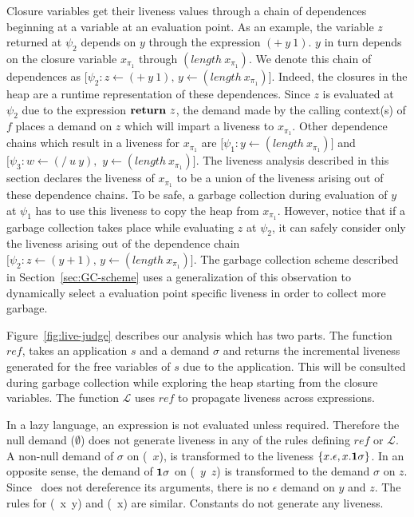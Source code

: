 \documentclass[preprint,9pt]{sigplanconf}
\begin{document}
  Closure  variables get  their  liveness values  through  a chain  of
  dependences beginning at  a variable at an evaluation  point.  As an
  example,  the  variable $z$  returned  at  $\psi_2$ depends  on  $y$
  through  the  expression $(+~y~1)$.   $y$  in  turn depends  on  the
  closure  variable  $x_{\pi_1}$   through  $(length~x_{\pi_1})$.   We
  denote  this chain  of dependences  as $\lbrack  \psi_2\!\!\!:\!\!\!z \leftarrow
  (+~y~1),\,  y  \leftarrow   (length~x_{\pi_1})\rbrack$.   Indeed,  the
  closures  in  the  heap  are   a  runtime  representation  of  these
  dependences.  Since  $z$  is  evaluated   at  $\psi_2$  due  to  the
  expression $\mbox{$\mathbf{ return}$}~z$,  the demand made by  the calling context(s)
  of  $f$ places  a demand  on  $z$ which  will impart  a liveness  to
  $x_{\pi_1}$.  Other dependence chains which result in a liveness for
  $x_{\pi_1}$       are       $\lbrack       \psi_1\!\!\!:\!\!y       \leftarrow
  (length~x_{\pi_1})\rbrack$ and $\lbrack \psi_3\!\!\!:\!\!\!w \leftarrow (/~u~y),\,\,
  y  \leftarrow  (length~x_{\pi_1})\rbrack$.   The  liveness  analysis
  described in this section declares the liveness of $x_{\pi_1}$ to be
  a union of the liveness arising  out of these dependence chains.  To
  be safe, a  garbage collection during evaluation of  $y$ at $\psi_1$
  has  to  use  this  liveness  to copy  the  heap  from  $x_{\pi_1}$.
  However,  notice that  if  a garbage  collection  takes place  while
  evaluating $z$ at $\psi_2$, it can safely consider only the liveness
  arising  out of  the dependence  chain\linebreak $\lbrack  \psi_2\!\!\!:\!\!\!z \leftarrow
  (y+1),\,   y  \leftarrow   (length~x_{\pi_1})\rbrack$.   The   garbage
  collection  scheme described  in Section~\ref{sec:GC-scheme}  uses a
  generalization  of   this  observation   to  dynamically   select  a
  evaluation point specific liveness in order to collect more garbage.



Figure~\ref{fig:live-judge}  describes  our  analysis  which  has  two
parts. The  function $\mathit{ref}$,  takes an  application $s$  and a
demand $\sigma$ and returns the incremental liveness generated for the
free variables of $s$ due to  the application.  This will be consulted
during garbage collection  while exploring the heap  starting from the
closure  variables.  The function $\mathcal{L}$  uses  $\mathit{ref}$ to  propagate
liveness across expressions.

In  a   lazy  language,   an  expression   is  not   evaluated  unless
required. Therefore  the null  demand ($\emptyset$) does  not generate
liveness in any of the rules defining $\mathit{ref}$ or $\mathcal{L}$.
A non-null  demand of  $\sigma$ on (\CDR~$x$),  is transformed  to the
liveness $\{x.\epsilon,  x.\mathbf{1}\sigma\}$.  In an opposite  sense, the
demand  of  $\mathbf{1}\sigma$ on  (\CONS~$y$~$z$)  is  transformed to  the
demand  $\sigma$  on  $z$.   Since \CONS\  does  not  dereference  its
arguments, there  is no $\epsilon$ demand  on $y$ and $z$.   The rules
for (\PRIM~x~y) and (\NULLQ~x) are  similar. Constants do not generate
any liveness.
\end{document}
